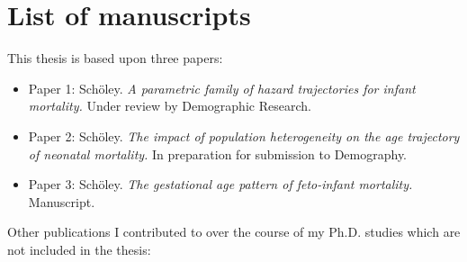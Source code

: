 \documentclass[10pt, twoside]{book}
\begin{document}

\clearpage

\section*{List of manuscripts}

This thesis is based upon three papers:

\begin{itemize}
\item Paper 1: Schöley. \emph{A parametric family of hazard trajectories for infant mortality.} Under review by Demographic Research.
\item Paper 2: Schöley. \emph{The impact of population heterogeneity on the age trajectory of neonatal mortality.} In preparation for submission to Demography.
\item Paper 3: Schöley. \emph{The gestational age pattern of feto-infant mortality.} Manuscript.
\end{itemize}

Other publications I contributed to over the course of my Ph.D. studies which are not included in the thesis:
\end{document}
